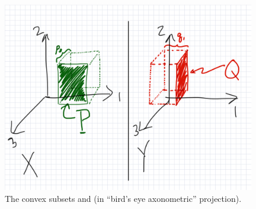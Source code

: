 \documentclass[11pt]{article}
\begin{document}
\begin{figure}[t]
\centerline{\includegraphics[height=3.25in]{DP_II.3.9a_PHM_fig1.png}}
\caption{\small The convex subsets  and
   (in ``bird's eye axonometric'' projection).}
\label{Fig:PQ}
\end{figure}
\end{document}
